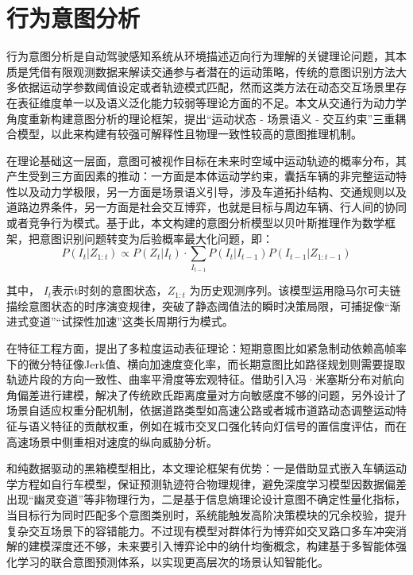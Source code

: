 \section{行为意图分析}

行为意图分析是自动驾驶感知系统从环境描述迈向行为理解的关键理论问题，其本质是凭借有限观测数据来解读交通参与者潜在的运动策略，传统的意图识别方法大多依据运动学参数阈值设定或者轨迹模式匹配，然而这类方法在动态交互场景里存在表征维度单一以及语义泛化能力较弱等理论方面的不足。本文从交通行为动力学角度重新构建意图分析的理论框架，提出“运动状态 - 场景语义 - 交互约束”三重耦合模型，以此来构建有较强可解释性且物理一致性较高的意图推理机制。

在理论基础这一层面，意图可被视作目标在未来时空域中运动轨迹的概率分布，其产生受到三方面因素的推动：一方面是本体运动学约束，囊括车辆的非完整运动特性以及动力学极限，另一方面是场景语义引导，涉及车道拓扑结构、交通规则以及道路边界条件，另一方面是社会交互博弈，也就是目标与周边车辆、行人间的协同或者竞争行为模式。基于此，本文构建的意图分析模型以贝叶斯推理作为数学框架，把意图识别问题转变为后验概率最大化问题，即：
\begin{equation}
	P(I_t | Z_{1:t}) \propto P(Z_t | I_t) \cdot \sum_{I_{t-1}} P(I_t | I_{t - 1}) P(I_{t - 1} | Z_{1:t - 1})
\end{equation}

其中， $I_t$表示t时刻的意图状态，\(Z_{1:t}\) 为历史观测序列。该模型运用隐马尔可夫链描绘意图状态的时序演变规律，突破了静态阈值法的瞬时决策局限，可捕捉像“渐进式变道”“试探性加速”这类长周期行为模式。

在特征工程方面，提出了多粒度运动表征理论：短期意图比如紧急制动依赖高帧率下的微分特征像Jerk值、横向加速度变化率，而长期意图比如路径规划则需要提取轨迹片段的方向一致性、曲率平滑度等宏观特征。借助引入冯·米塞斯分布对航向角偏差进行建模，解决了传统欧氏距离度量对方向敏感度不够的问题，另外设计了场景自适应权重分配机制，依据道路类型如高速公路或者城市道路动态调整运动特征与语义特征的贡献权重，例如在城市交叉口强化转向灯信号的置信度评估，而在高速场景中侧重相对速度的纵向威胁分析。

和纯数据驱动的黑箱模型相比，本文理论框架有优势：一是借助显式嵌入车辆运动学方程如自行车模型，保证预测轨迹符合物理规律，避免深度学习模型因数据偏差出现“幽灵变道”等非物理行为，二是基于信息熵理论设计意图不确定性量化指标，当目标行为同时匹配多个意图类别时，系统能触发高阶决策模块的冗余校验，提升复杂交互场景下的容错能力。不过现有模型对群体行为博弈如交叉路口多车冲突消解的建模深度还不够，未来要引入博弈论中的纳什均衡概念，构建基于多智能体强化学习的联合意图预测体系，以实现更高层次的场景认知智能化。


\begin{tabular}{l l}
\end{tabular}
